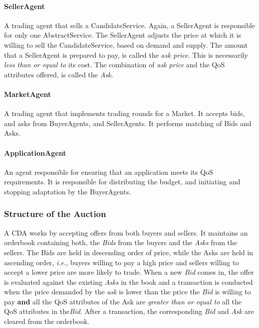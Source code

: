 \documentclass[10pt,journal,compsoc]{IEEEtran}
\begin{document}
\paragraph{SellerAgent} A trading agent that sells a CandidateService. Again, a SellerAgent is responsible for only one AbstractService. The SellerAgent adjusts the price at which it is willing to sell the CandidateService, based on demand and supply. The amount that a SellerAgent is prepared to pay, is called the \textsl{ask price}. This is necessarily \textit{less than or equal to } its cost. The combination of \textsl{ask price} and the QoS attributes offered, is called the \textsl{Ask}.

\paragraph{MarketAgent} A trading agent that implements trading rounds for a Market. It accepts bids, and asks from BuyerAgents, and SellerAgents. It performs matching of Bids and Asks.

\paragraph{ApplicationAgent} An agent responsible for ensuring that an application meets its QoS requirements. It is responsible for distributing the budget, and initiating and stopping adaptation by the BuyerAgents.

\subsubsection{Structure of the Auction}
A CDA works by accepting offers from both buyers and sellers. It maintains an orderbook containing both, the \textsl{Bids} from the buyers and the \textsl{Asks} from the sellers. The Bids are held in descending order of price, while the Asks are held in ascending order, \textit{i.e.}, buyers willing to pay a high price and sellers willing to accept a lower price are more likely to trade. When a new \textit{Bid} comes in, the offer is evaluated against the existing \textit{Asks} in the book and a transaction is conducted when the price demanded by the \textit{ask} is lower than the price the \textit{Bid} is willing to pay \textbf{and} all the QoS attributes of the Ask are \textit{greater than or equal to} all the QoS attributes in the\textit{Bid}. After a transaction, the corresponding \textit{Bid} and \textit{Ask} are cleared from the orderbook.
\end{document}
